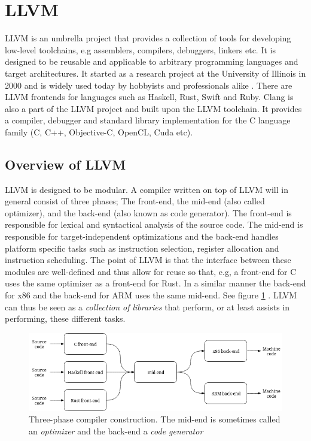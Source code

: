 \section{LLVM}
\label{sec:llvm}

LLVM is an umbrella project that provides a collection of tools for developing low-level
toolchains, e.g assemblers, compilers, debuggers, linkers etc. It is designed to be reusable and
applicable to arbitrary programming languages and target architectures. It started as a
research project at the University of Illinois in 2000 and is widely used today by hobbyists
and professionals alike \cite{llvm-overview}. There are LLVM frontends for languages such
as Haskell\cite{ghc-backend}, Rust\cite{rust-llvm}, Swift\cite{swift-llvm} and Ruby\cite{rubymotion}. Clang is also a part
of the LLVM project and built upon the LLVM toolchain. It provides a compiler, debugger
and standard library implementation for the C language family (C, C++, Objective-C,
OpenCL, Cuda etc)\cite{clang}.

\subsection{Overview of LLVM}

LLVM is designed to be modular. A compiler written on top of LLVM will in general consist
of three phases; The front-end, the mid-end (also called optimizer), and the back-end
(also known as code generator). The front-end is responsible for lexical and syntactical
analysis of the source code. The mid-end is responsible for target-independent optimizations
and the back-end handles platform specific tasks such as instruction selection, register
allocation and instruction scheduling\cite[Section~11.1]{aosa-llvm}. The point of LLVM is
that the interface between these modules are well-defined and thus allow for reuse so
that, e.g, a front-end for C uses the same optimizer as a front-end for Rust. In a similar
manner the back-end for x86 and the back-end for ARM uses the same mid-end. See figure
\ref{fig:three_phase_compiler} \cite[Section~11.4]{aosa-llvm}. LLVM can thus be seen as a \textit{collection of libraries}
\cite[Section~11.4.2]{aosa-llvm} that perform, or at least assists in performing, these different tasks.

\begin{figure}[h]
	\centering
	\includegraphics[width=12cm]{background/llvm/figures/three_phase_compiler}
	\caption{Three-phase compiler construction. The mid-end is sometimes called an \textit{optimizer}
	and the back-end a \textit{code generator}}
	\label{fig:three_phase_compiler}
\end{figure}

